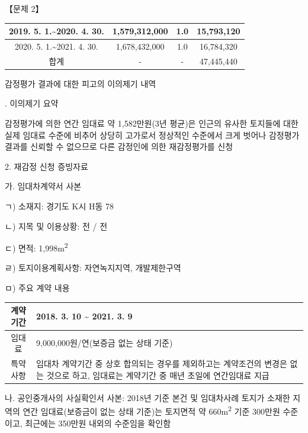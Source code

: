 \begin{longquestion}{【문제 2】}
{\begin{tabular}{|c|c|c|c|}
2019. 5. 1.\textasciitilde{}2020. 4. 30. & 1,579,312,000 & 1.0 & 15,793,120 \\\hline
2020. 5. 1.\textasciitilde{}2021. 4. 30. & 1,678,432,000 & 1.0 & 16,784,320 \\\hline
합계 & - & - & 47,445,440 \\\hline
\end{tabular}\par}
\medskip{} 감정평가 결과에 대한 피고의 이의제기 내역 \par
\medskip{}. 이의제기 요약 \par
감정평가에 의한 연간 임대료 약 1,582만원(3년 평균)은 인근의 유사한 토지들에 대한 실제 임대료 수준에 비추어 상당히 고가로서 정상적인 수준에서 크게 벗어나 감정평가 결과를 신뢰할 수 없으므로 다른 감정인에 의한 재감정평가를 신청 \par
2. 재감정 신청 증빙자료 \par
\hspace*{1em}가. 임대차계약서 사본 \par
\hspace*{2em}ㄱ) 소재지: 경기도 K시 H동 78 \par
\hspace*{2em}ㄴ) 지목 및 이용상황: 전 / 전 \par
\hspace*{2em}ㄷ) 면적: 1,998m\textsuperscript{2} \par
\hspace*{2em}ㄹ) 토지이용계획사항: 자연녹지지역, 개발제한구역 \par
\hspace*{2em}ㅁ) 주요 계약 내용 \par
{\small\centering
\begin{tabular}{|c|l|}\hline
계약기간 & 2018. 3. 10 \textasciitilde{} 2021. 3. 9 \\\hline
임대료 & 9,000,000원/연(보증금 없는 상태 기준) \\\hline
특약사항 & \parbox{0.6\linewidth}{임대차 계약기간 중 상호 합의되는 경우를 제외하고는 계약조건의 변경은 없는 것으로 하고, 임대료는 계약기간 중 매년 초일에 연간임대료 지급} \\\hline
\end{tabular}\par}
\hspace*{1em}나. 공인중개사의 사실확인서 사본: 2018년 기준 본건 및 임대차사례 토지가 소재한 지역의 연간 임대료(보증금이 없는 상태 기준)는 토지면적 약 660m\textsuperscript{2} 기준 300만원 수준이고, 최근에는 350만원 내외의 수준임을 확인함 \par

\end{longquestion}

